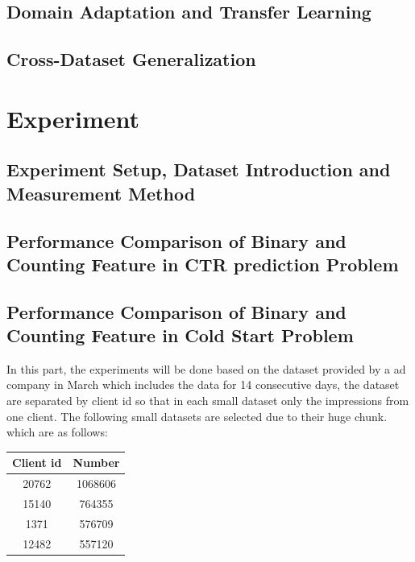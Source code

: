 \documentclass{sig-alternate}
\begin{document}
\subsection{Domain Adaptation and Transfer Learning}
\subsection{Cross-Dataset Generalization}



\section{Experiment}

\subsection{Experiment Setup, Dataset Introduction and Measurement Method}

\subsection{Performance Comparison of Binary and Counting Feature in CTR prediction Problem}

\subsection{Performance Comparison of Binary and Counting Feature in Cold Start Problem}

In this part, the experiments will be done based on the dataset provided by a ad company in March which includes the data for 14 consecutive days, the dataset are separated by client id so that in each small dataset only the impressions from one client. The following small datasets are selected due to their huge chunk. which are as follows:

\begin{table}[h]
 \centering
 \begin{tabular}{ ||c c || } 
 \hline
 Client id  & Number \\
 \hline
 20762 & 1068606 \\ 
  15140 & 764355 \\ 
   1371 & 576709 \\ 
   12482 & 557120\\
 \hline
 \end{tabular}
 \label{tab:campainid}
 \end{table}
 
\end{document}
